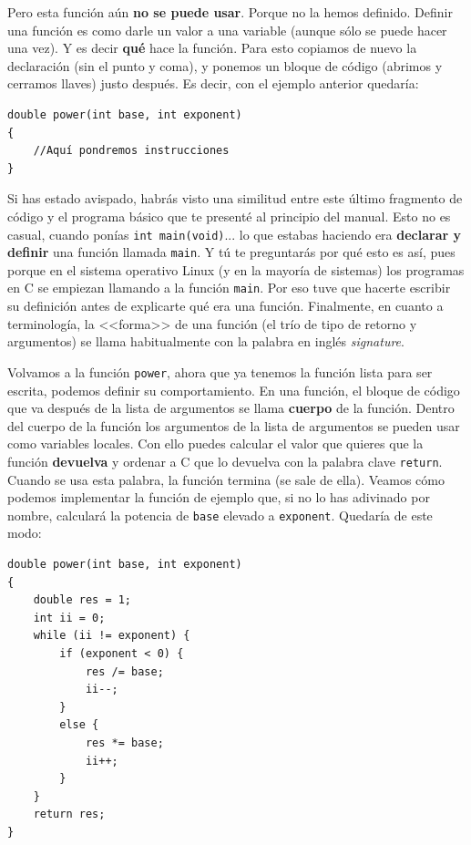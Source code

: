 \documentclass[a4paper]{article}
\begin{document}
Pero esta función aún \textbf{no se puede usar}. Porque no la hemos definido.
Definir una función es como darle un valor a una variable (aunque sólo se puede
hacer una vez). Y es decir \textbf{qué} hace la función. Para esto copiamos
de nuevo la declaración (sin el punto y coma), y ponemos un bloque de código
(abrimos y cerramos llaves) justo después. Es decir, con el ejemplo anterior
quedaría:


\noindent
\begin{minipage}[H]{\linewidth}
\mbox{}
\begin{lstlisting}[style=C, label={lst:functionDefinition},
caption={Definición de una función en C}]
double power(int base, int exponent)
{
    //Aquí pondremos instrucciones
}
\end{lstlisting}
\end{minipage}

Si has estado avispado, habrás visto una similitud entre este último fragmento
de código y el programa básico que te presenté al principio del manual. Esto
no es casual, cuando ponías \verb!int main(void)!... lo que estabas haciendo era
\textbf{declarar y definir} una función llamada \verb!main!. Y tú te
preguntarás por qué esto es así, pues porque en el sistema operativo Linux (y en
la mayoría de sistemas) los programas en C se empiezan llamando a la
función \verb!main!. Por eso tuve que hacerte escribir su definición antes de
explicarte qué era una función. Finalmente, en cuanto a terminología, la
<<forma>> de una función (el trío de tipo de retorno y argumentos) se
llama habitualmente con la palabra en inglés \emph{signature}.

Volvamos a la función \verb!power!, ahora que ya tenemos la función lista
para ser escrita, podemos definir su comportamiento. En una función, el bloque
de código que va después de la lista de argumentos se llama \textbf{cuerpo} de
la función. Dentro del cuerpo de la función los argumentos de la lista de
argumentos se pueden usar como variables locales.
Con ello puedes calcular el valor
que quieres que la función \textbf{devuelva} y ordenar a C que lo devuelva con
la palabra clave \lstinline[style=C]{return}. Cuando se usa esta palabra,
la función termina (se sale de ella). Veamos cómo podemos implementar la
función de ejemplo que, si no lo has adivinado por nombre, calculará la potencia
de \verb!base! elevado a \verb!exponent!. Quedaría de este modo:


\noindent
\begin{minipage}[H]{\linewidth}
\mbox{}
\begin{lstlisting}[style=C, label={lst:functionExample},
caption={Ejemplo de función en C}]
double power(int base, int exponent)
{
    double res = 1;
    int ii = 0;
    while (ii != exponent) {
        if (exponent < 0) {
            res /= base;
            ii--;
        }
        else {
            res *= base;
            ii++;
        }
    }
    return res;
}
\end{lstlisting}
\end{minipage}
\end{document}
